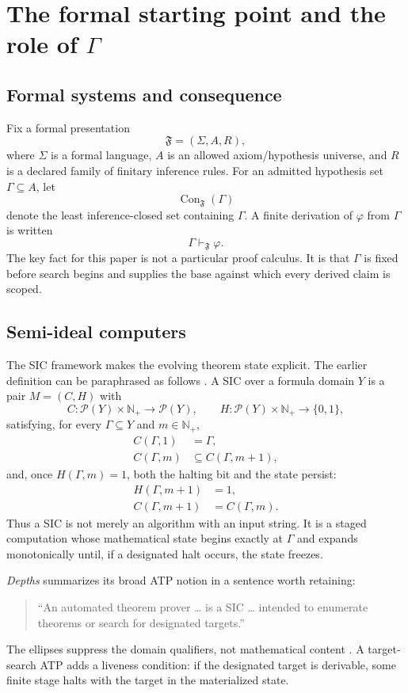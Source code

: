 \documentclass[11pt]{article}
\theoremstyle{definition}
\theoremstyle{remark}
\newcommand{\Np}{\mathbb N_{+}}
\begin{document}
\section{The formal starting point and the role of \texorpdfstring{$\Gamma$}{Gamma}}

\subsection{Formal systems and consequence}
Fix a formal presentation
\[
\mathfrak F=(\Sigma,A,R),
\]
where $\Sigma$ is a formal language, $A$ is an allowed axiom/hypothesis universe, and $R$ is a declared family of finitary inference rules. For an admitted hypothesis set $\Gamma\subseteq A$, let
\[
\operatorname{Con}_{\mathfrak F}(\Gamma)
\]
denote the least inference-closed set containing $\Gamma$. A finite derivation of $\varphi$ from $\Gamma$ is written
\[
\Gamma\vdash_{\mathfrak F}\varphi.
\]
The key fact for this paper is not a particular proof calculus. It is that $\Gamma$ is fixed before search begins and supplies the base against which every derived claim is scoped.

\subsection{Semi-ideal computers}
The SIC framework makes the evolving theorem state explicit. The earlier definition can be paraphrased as follows \cite{Depths}. A SIC over a formula domain $Y$ is a pair $M=(C,H)$ with
\[
C:\mathcal P(Y)\times\Np\to\mathcal P(Y),
\qquad
H:\mathcal P(Y)\times\Np\to\{0,1\},
\]
satisfying, for every $\Gamma\subseteq Y$ and $m\in\Np$,
\begin{align}
C(\Gamma,1)&=\Gamma,\label{eq:sicseed}\\
C(\Gamma,m)&\subseteq C(\Gamma,m+1),\label{eq:sicmono}
\end{align}
and, once $H(\Gamma,m)=1$, both the halting bit and the state persist:
\begin{align}
H(\Gamma,m+1)&=1,\\
C(\Gamma,m+1)&=C(\Gamma,m).
\end{align}
Thus a SIC is not merely an algorithm with an input string. It is a staged computation whose mathematical state begins exactly at $\Gamma$ and expands monotonically until, if a designated halt occurs, the state freezes.

\emph{Depths} summarizes its broad ATP notion in a sentence worth retaining:
\begin{quote}
``An automated theorem prover \ldots{} is a SIC \ldots{} intended to enumerate theorems or search for designated targets.''
\end{quote}
The ellipses suppress the domain qualifiers, not mathematical content \cite{Depths}. A target-search ATP adds a liveness condition: if the designated target is derivable, some finite stage halts with the target in the materialized state.
\end{document}
